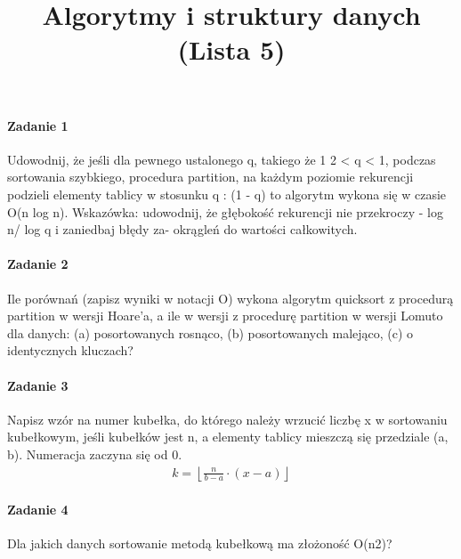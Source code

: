 \documentclass[18pt]{extarticle}
\begin{document}
\large
{}\selectfont

\title{Algorytmy i struktury danych (Lista 5)}
\date{}
\maketitle

\paragraph{Zadanie 1} Udowodnij, że jeśli dla pewnego ustalonego q, takiego że 1 2 < q < 1, podczas sortowania szybkiego, procedura partition, na każdym poziomie rekurencji podzieli elementy tablicy w stosunku q : (1 - q) to algorytm wykona się w czasie O(n log n). Wskazówka: udowodnij, że głębokość rekurencji nie przekroczy - log n/ log q i zaniedbaj błędy za-
okrągleń do wartości całkowitych.

\paragraph{Zadanie 2} Ile porównań (zapisz wyniki w notacji O) wykona algorytm quicksort z procedurą partition w wersji Hoare’a, a ile w wersji z procedurę partition w wersji Lomuto dla danych: (a) posortowanych rosnąco, (b) posortowanych malejąco, (c) o identycznych kluczach?

\paragraph{Zadanie 3} Napisz wzór na numer kubełka, do którego należy wrzucić liczbę x w sortowaniu kubełkowym, jeśli kubełków jest n, a elementy tablicy mieszczą się przedziale (a, b). Numeracja zaczyna się od 0. \\


\begin{align*}
    k = \left \lfloor \frac{n}{b - a} \cdot (x - a) \right \rfloor
\end{align*}

\paragraph{Zadanie 4} Dla jakich danych sortowanie metodą kubełkową ma złożoność O(n2)? \\
\end{document}
